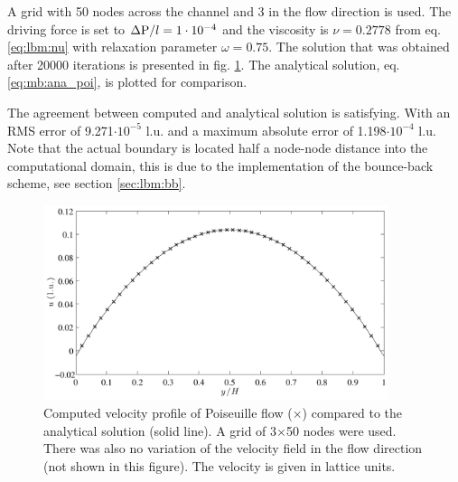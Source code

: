 A grid with 50 nodes across the channel and 3 in the flow direction is
used. The driving force is set to $\Delta \mathrm{P} / l = 1\cdot 10^{-4}$
and the viscosity is $\nu = 0.2778$ from eq. \eqref{eq:lbm:nu} with
relaxation parameter $\omega = 0.75$. The solution that was obtained
after 20000 iterations is presented in fig. \ref{fig:mb:poi}. The
analytical solution, eq. \eqref{eq:mb:ana_poi}, is plotted for
comparison.

The agreement between computed and analytical solution is
satisfying. With an RMS error of 9.271$\cdot 10^{-5}$ l.u. and a maximum
absolute error of 1.198$\cdot10^{-4}$ l.u. Note that the actual boundary
is located half a node-node distance into the computational domain,
this is due to the implementation of the bounce-back scheme, see
section \ref{sec:lbm:bb}.  

\begin{figure}
\begin{center}
\includegraphics[width=0.9\textwidth]{fig/poiseuille.pdf}
\end{center}
\caption[Computed velocity profile of Poiseuille flow.]{Computed
  velocity profile of Poiseuille flow ($\times$) compared to the
  analytical solution (solid line). A grid of 3$\times$50 nodes were
  used. There was also no variation of the velocity field in the flow
  direction (not shown in this figure). The velocity is given in
  lattice units.}
\label{fig:mb:poi}
\end{figure}

